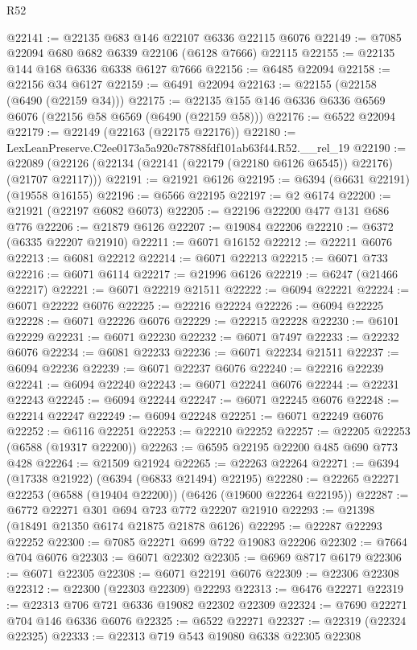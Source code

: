 \begin{lexlean}{R52}
\begin{coremodule}
@22141 := @22135 @683 @146 @22107 @6336 @22115 @6076
@22149 := @7085 @22094 @680 @682 @6339 @22106 (@6128 @7666) @22115
@22155 := @22135 @144 @168 @6336 @6338 @6127 @7666
@22156 := @6485 @22094
@22158 := @22156 @34 @6127
@22159 := @6491 @22094
@22163 := @22155 (@22158 (@6490 (@22159 @34)))
@22175 := @22135 @155 @146 @6336 @6336 @6569 @6076 (@22156 @58 @6569 (@6490 (@22159 @58)))
@22176 := @6522 @22094
@22179 := @22149 (@22163 (@22175 @22176))
@22180 := LexLeanPreserve.C2ee0173a5a920c78788fdf101ab63f44.R52.__rel_19
@22190 := @22089 (@22126 (@22134 (@22141 (@22179 (@22180 @6126 @6545)) @22176) (@21707 @22117)))
@22191 := @21921 @6126
@22195 := @6394 (@6631 @22191) (@19558 @16155)
@22196 := @6566 @22195
@22197 := @2 @6174
@22200 := @21921 (@22197 @6082 @6073)
@22205 := @22196 @22200 @477 @131 @686 @776
@22206 := @21879 @6126
@22207 := @19084 @22206
@22210 := @6372 (@6335 @22207 @21910)
@22211 := @6071 @16152
@22212 := @22211 @6076
@22213 := @6081 @22212
@22214 := @6071 @22213
@22215 := @6071 @733
@22216 := @6071 @6114
@22217 := @21996 @6126
@22219 := @6247 (@21466 @22217)
@22221 := @6071 @22219 @21511
@22222 := @6094 @22221
@22224 := @6071 @22222 @6076
@22225 := @22216 @22224
@22226 := @6094 @22225
@22228 := @6071 @22226 @6076
@22229 := @22215 @22228
@22230 := @6101 @22229
@22231 := @6071 @22230
@22232 := @6071 @7497
@22233 := @22232 @6076
@22234 := @6081 @22233
@22236 := @6071 @22234 @21511
@22237 := @6094 @22236
@22239 := @6071 @22237 @6076
@22240 := @22216 @22239
@22241 := @6094 @22240
@22243 := @6071 @22241 @6076
@22244 := @22231 @22243
@22245 := @6094 @22244
@22247 := @6071 @22245 @6076
@22248 := @22214 @22247
@22249 := @6094 @22248
@22251 := @6071 @22249 @6076
@22252 := @6116 @22251
@22253 := @22210 @22252
@22257 := @22205 @22253 (@6588 (@19317 @22200))
@22263 := @6595 @22195 @22200 @485 @690 @773 @428
@22264 := @21509 @21924
@22265 := @22263 @22264
@22271 := @6394 (@17338 @21922) (@6394 (@6833 @21494) @22195)
@22280 := @22265 @22271 @22253 (@6588 (@19404 @22200)) (@6426 (@19600 @22264 @22195))
@22287 := @6772 @22271 @301 @694 @723 @772 @22207 @21910
@22293 := @21398 (@18491 @21350 @6174 @21875 @21878 @6126)
@22295 := @22287 @22293 @22252
@22300 := @7085 @22271 @699 @722 @19083 @22206
@22302 := @7664 @704 @6076
@22303 := @6071 @22302
@22305 := @6969 @8717 @6179
@22306 := @6071 @22305
@22308 := @6071 @22191 @6076
@22309 := @22306 @22308
@22312 := @22300 (@22303 @22309) @22293
@22313 := @6476 @22271
@22319 := @22313 @706 @721 @6336 @19082 @22302 @22309
@22324 := @7690 @22271 @704 @146 @6336 @6076
@22325 := @6522 @22271
@22327 := @22319 (@22324 @22325)
@22333 := @22313 @719 @543 @19080 @6338 @22305 @22308

\end{coremodule}
\end{lexlean}
